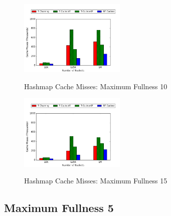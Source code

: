     \begin{figure}[H]
    \centering
        {\includegraphics[width=0.45\textwidth]{maps/9010cm.png}}
        \caption{Hashmap Cache Misses: Maximum Fullness 10}
    \end{figure}

    \begin{figure}[H]
    \centering
        {\includegraphics[width=0.45\textwidth]{maps/905cm.png}}
        \caption{Hashmap Cache Misses: Maximum Fullness 15}
    \end{figure}

\subsection{Maximum Fullness 5}

